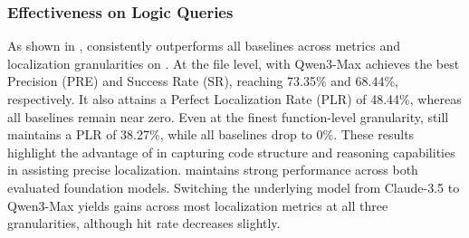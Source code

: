 \subsubsection{Effectiveness on Logic Queries}

As shown in , \tooldataloc consistently outperforms all baselines across metrics and localization granularities on \dataset. At the file level, \tooldataloc with Qwen3-Max achieves the best Precision (PRE) and Success Rate (SR), reaching 73.35\% and 68.44\%, respectively. It also attains a Perfect Localization Rate (PLR) of 48.44\%, whereas all baselines remain near zero. Even at the finest function-level granularity, \tooldataloc still maintains a PLR of 38.27\%, while all baselines drop to 0\%. These results highlight the advantage of \tooldataloc in capturing code structure and reasoning capabilities in assisting precise localization. \tooldataloc maintains strong performance across both evaluated foundation models. Switching the underlying model from Claude-3.5 to Qwen3-Max yields gains across most localization metrics at all three granularities, although hit rate decreases slightly.

